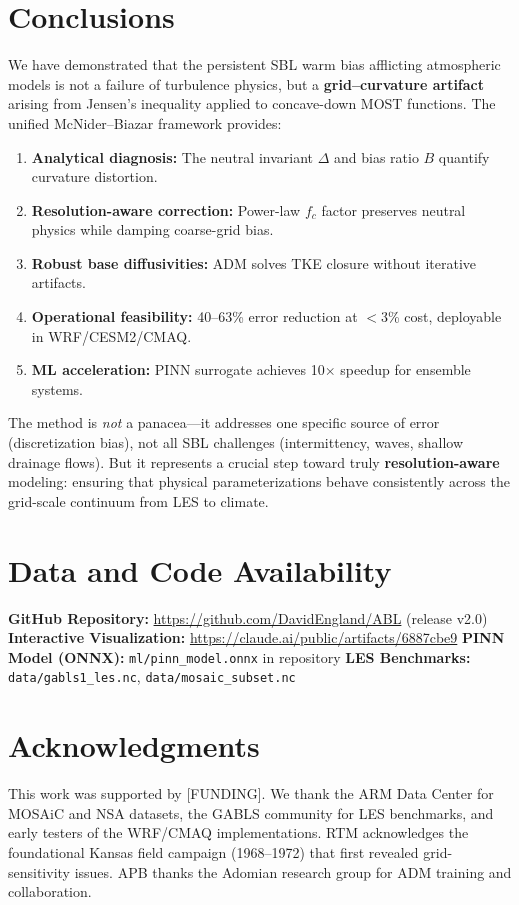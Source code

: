 \documentclass[twocolumn,11pt]{article}
\begin{document}
\section{Conclusions}

We have demonstrated that the persistent SBL warm bias afflicting atmospheric models is not a failure of turbulence physics, but a \textbf{grid--curvature artifact} arising from Jensen's inequality applied to concave-down MOST functions. The unified McNider--Biazar framework provides:

\begin{enumerate}
\item \textbf{Analytical diagnosis:} The neutral invariant $\Delta$ and bias ratio $B$ quantify curvature distortion.
\item \textbf{Resolution-aware correction:} Power-law $f_c$ factor preserves neutral physics while damping coarse-grid bias.
\item \textbf{Robust base diffusivities:} ADM solves TKE closure without iterative artifacts.
\item \textbf{Operational feasibility:} 40--63\% error reduction at $<$3\% cost, deployable in WRF/CESM2/CMAQ.
\item \textbf{ML acceleration:} PINN surrogate achieves 10$\times$ speedup for ensemble systems.
\end{enumerate}

\noindent The method is \textit{not} a panacea—it addresses one specific source of error (discretization bias), not all SBL challenges (intermittency, waves, shallow drainage flows). But it represents a crucial step toward truly \textbf{resolution-aware} modeling: ensuring that physical parameterizations behave consistently across the grid-scale continuum from LES to climate.

\section*{Data and Code Availability}

\noindent \textbf{GitHub Repository:} \url{https://github.com/DavidEngland/ABL} (release v2.0)  
\noindent \textbf{Interactive Visualization:} \url{https://claude.ai/public/artifacts/6887cbe9}  
\noindent \textbf{PINN Model (ONNX):} \texttt{ml/pinn\_model.onnx} in repository  
\noindent \textbf{LES Benchmarks:} \texttt{data/gabls1\_les.nc}, \texttt{data/mosaic\_subset.nc}

\section*{Acknowledgments}

This work was supported by [FUNDING]. We thank the ARM Data Center for MOSAiC and NSA datasets, the GABLS community for LES benchmarks, and early testers of the WRF/CMAQ implementations. RTM acknowledges the foundational Kansas field campaign (1968--1972) that first revealed grid-sensitivity issues. APB thanks the Adomian research group for ADM training and collaboration.



\end{document}
